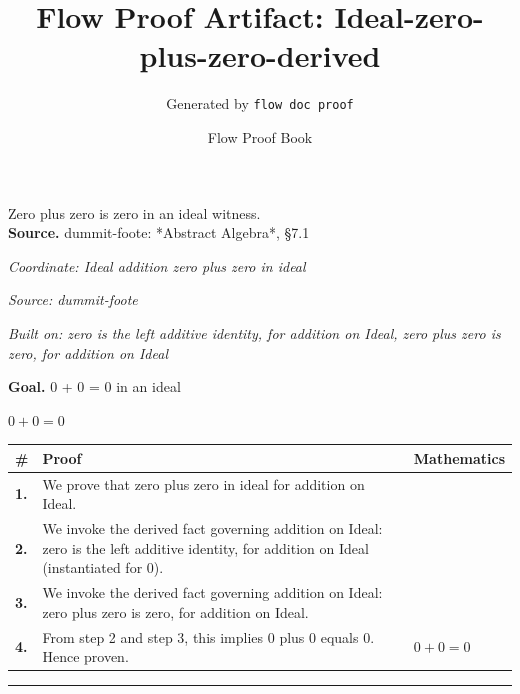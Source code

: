 \documentclass[11pt]{article}
\title{Flow Proof Artifact: Ideal-zero-plus-zero-derived}
\author{Generated by \texttt{flow doc proof}}
\date{Flow Proof Book}
\theoremstyle{definition}
\begin{document}
\maketitle
Zero plus zero is zero in an ideal witness.\\[0.5em]
\textbf{Source.} dummit-foote: *Abstract Algebra*, §7.1\\[0.5em]
\bigskip
{}\par
\smallskip\noindent\textit{Coordinate: Ideal \cdot addition \cdot zero plus zero in ideal}\par
\smallskip\noindent\textit{Source: dummit-foote}\par
\smallskip\noindent\textit{Built on: zero is the left additive identity, for addition on Ideal, zero plus zero is zero, for addition on Ideal}\par
\medskip
\noindent\textbf{Goal.} 0 + 0 = 0 in an ideal\par
\noindent$\displaystyle 0 + 0 = 0$\par
\medskip
\noindent
\begin{tabular}{@{} >{\raggedright\arraybackslash}p{} >{\raggedright\arraybackslash}p{} >{\raggedleft\arraybackslash}p{} @{}}
\textbf{\#} & \textbf{Proof} & \textbf{Mathematics} \\
\midrule
\textbf{1.} & We prove that zero plus zero in ideal for addition on Ideal. & \\[0.45em]
\textbf{2.} & We invoke the derived fact governing addition on Ideal: zero is the left additive identity, for addition on Ideal (instantiated for 0). & \\[0.45em]
\textbf{3.} & We invoke the derived fact governing addition on Ideal: zero plus zero is zero, for addition on Ideal. & \\[0.45em]
\textbf{4.} & From step 2 and step 3, this implies 0 plus 0 equals 0. Hence proven. & $\displaystyle 0 + 0 = 0$ \\[0.45em]
\bottomrule
\end{tabular}
\label{thm:Ideal-addition-zero_plus_zero_in_ideal}
\par\medskip\hrule
\end{document}
